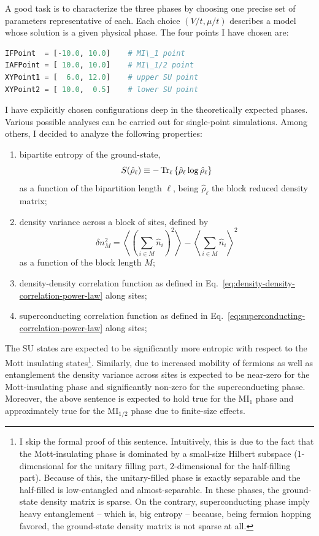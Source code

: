 A good task is to characterize the three phases by choosing one precise set of parameters representative of each. Each choice $(V/t,\mu/t)$ describes a model whose solution is a given physical phase. The four points I have chosen are:
\begin{lstlisting}[language=julia]
IFPoint  = [-10.0, 10.0]	# MI\_1 point
IAFPoint = [ 10.0, 10.0]	# MI\_1/2 point
XYPoint1 = [  6.0, 12.0]	# upper SU point
XYPoint2 = [ 10.0,  0.5]	# lower SU point
\end{lstlisting}
I have explicitly chosen configurations deep in the theoretically expected phases. Various possible analyses can be carried out for single-point simulations. Among others, I decided to analyze the following properties:
\begin{enumerate}
	\item bipartite entropy of the ground-state,
	\begin{equation}\label{eq:bipartite-entropy-definition}
		S(\hat \rho_\ell) \equiv - \Tr_\ell \left\lbrace \hat \rho_\ell \log \hat \rho_\ell \right\rbrace
	\end{equation}
	as a function of the bipartition length $\ell$, being $\hat \rho_\ell$ the block reduced density matrix;
	\item density variance across a block of sites, defined by
	\begin{equation}\label{eq:density-block-variance-definition}
		\delta n_M^2 = \left\langle \left( \sum_{i \in M} \hat n_i \right)^2 \right\rangle - \left\langle \sum_{i \in M} \hat n_i \right\rangle^2
	\end{equation}
	as a function of the block length $M$;
	\item density-density correlation function as defined in Eq.~\eqref{eq:density-density-correlation-power-law} along sites;
	\item superconducting correlation function as defined in Eq.~\eqref{eq:superconducting-correlation-power-law} along sites;
\end{enumerate}
The $\mathrm{SU}$ states are expected to be significantly more entropic with respect to the Mott insulating states\footnote{
	I skip the formal proof of this sentence. Intuitively, this is due to the fact that the Mott-insulating phase is dominated by a small-size Hilbert subspace ($1$-dimensional for the unitary filling part, $2$-dimensional for the half-filling part). Because of this, the unitary-filled phase is exactly separable and the half-filled is low-entangled and almost-separable. In these phases, the ground-state density matrix is sparse. On the contrary, superconducting phase imply heavy entanglement -- which is, big entropy -- because, being fermion hopping favored, the ground-state density matrix is not sparse at all.
}. Similarly, due to increased mobility of fermions as well as entanglement the density variance across sites is expected to be near-zero for the Mott-insulating phase and significantly non-zero for the superconducting phase. Moreover, the above sentence is expected to hold true for the $\mathrm{MI}_1$ phase and approximately true for the $\mathrm{MI}_{1/2}$ phase due to finite-size effects.


